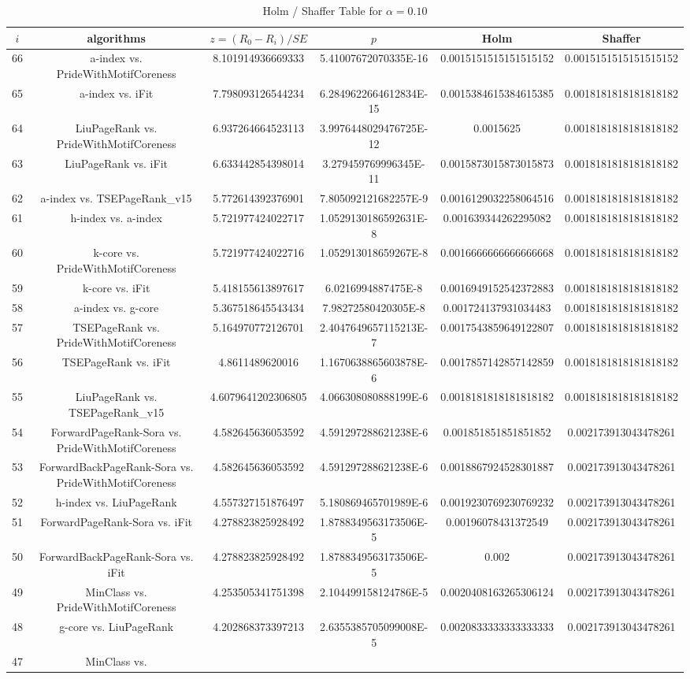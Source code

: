 \documentclass[a4paper,10pt]{article}
\begin{document}
\begin{landscape}
\begin{table}[!htp]
\centering\tiny
\caption{Holm / Shaffer Table for $\alpha=0.10$}
\begin{tabular}{cccccc}
$i$&algorithms&$z=(R_0 - R_i)/SE$&$p$&Holm&Shaffer\\
\hline
66&a-index vs. PrideWithMotifCoreness&8.101914936669333&5.41007672070335E-16&0.0015151515151515152&0.0015151515151515152\\65&a-index vs. iFit&7.798093126544234&6.2849622664612834E-15&0.0015384615384615385&0.0018181818181818182\\64&LiuPageRank vs. PrideWithMotifCoreness&6.937264664523113&3.9976448029476725E-12&0.0015625&0.0018181818181818182\\63&LiuPageRank vs. iFit&6.633442854398014&3.279459769996345E-11&0.0015873015873015873&0.0018181818181818182\\62&a-index vs. TSEPageRank_v15&5.772614392376901&7.805092121682257E-9&0.0016129032258064516&0.0018181818181818182\\61&h-index vs. a-index&5.721977424022717&1.0529130186592631E-8&0.001639344262295082&0.0018181818181818182\\60&k-core vs. PrideWithMotifCoreness&5.721977424022716&1.052913018659267E-8&0.0016666666666666668&0.0018181818181818182\\59&k-core vs. iFit&5.418155613897617&6.0216994887475E-8&0.0016949152542372883&0.0018181818181818182\\58&a-index vs. g-core&5.367518645543434&7.98272580420305E-8&0.001724137931034483&0.0018181818181818182\\57&TSEPageRank vs. PrideWithMotifCoreness&5.164970772126701&2.4047649657115213E-7&0.0017543859649122807&0.0018181818181818182\\56&TSEPageRank vs. iFit&4.8611489620016&1.1670638865603878E-6&0.0017857142857142859&0.0018181818181818182\\55&LiuPageRank vs. TSEPageRank_v15&4.6079641202306805&4.066308080888199E-6&0.0018181818181818182&0.0018181818181818182\\54&ForwardPageRank-Sora vs. PrideWithMotifCoreness&4.582645636053592&4.591297288621238E-6&0.001851851851851852&0.002173913043478261\\53&ForwardBackPageRank-Sora vs. PrideWithMotifCoreness&4.582645636053592&4.591297288621238E-6&0.0018867924528301887&0.002173913043478261\\52&h-index vs. LiuPageRank&4.557327151876497&5.180869465701989E-6&0.0019230769230769232&0.002173913043478261\\51&ForwardPageRank-Sora vs. iFit&4.278823825928492&1.8788349563173506E-5&0.00196078431372549&0.002173913043478261\\50&ForwardBackPageRank-Sora vs. iFit&4.278823825928492&1.8788349563173506E-5&0.002&0.002173913043478261\\49&MinClass vs. PrideWithMotifCoreness&4.253505341751398&2.104499158124786E-5&0.0020408163265306124&0.002173913043478261\\48&g-core vs. LiuPageRank&4.202868373397213&2.6355385705099008E-5&0.0020833333333333333&0.002173913043478261\\47&MinClass vs. 
\end{tabular}
\end{table}
\end{landscape}
\end{document}
